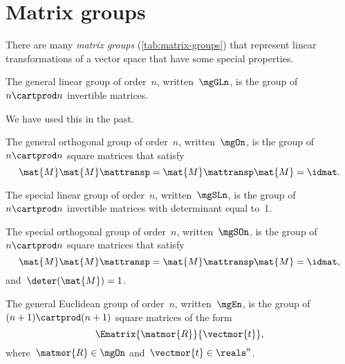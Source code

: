 \section{Matrix groups}


There are many \emph{matrix groups} (\cref{tab:matrix-groups}) that represent linear transformations of a vector space that have some special properties.

\begin{definition}
    \label{def:general-linear-group}
    The general linear group of order~$n$, written~$\mgGLn$, is the group of $n\cartprod n$ invertible matrices.
\end{definition}

We have used this in the past.

\begin{definition}
    \label{def:general-orthogonal-group}
    The general orthogonal group of order~$n$, written~$\mgOn$, is the group of~$n\cartprod n$ square matrices that satisfy
    \begin{equation}
        \mat{M} \mat{M}\mattransp = \mat{M}\mattransp \mat{M} = \idmat.
    \end{equation}
\end{definition}


\begin{definition}
    \label{def:special-linear-group}
    The special linear group of order~$n$, written~$\mgSLn$, is the group of~$n\cartprod n$ invertible matrices with determinant equal to~1.
\end{definition}
\begin{definition}
    \label{def:special-orthogonal-group}
    The special orthogonal group of order~$n$, written~$\mgSOn$, is the group of~$n\cartprod n$ square matrices that satisfy
    \begin{equation}
        \mat{M} \mat{M}\mattransp = \mat{M}\mattransp \mat{M} = \idmat,
    \end{equation}
    and~$\deter(\mat{M}) = 1$.
\end{definition}

\begin{definition}
    \label{def:general-euclidean-group}
    The general Euclidean group of order~$n$, written~$\mgEn$, is the group of~$(n+1)\cartprod (n+1)$ square matrices of the form
    \begin{equation}
        \label{eq:En-def}
        \Ematrix{\matmor{R}}{\vectmor{t}},
    \end{equation}
    where~$\matmor{R}\in \mgOn$ and~$\vectmor{t} \in \reals^n$.
\end{definition}


